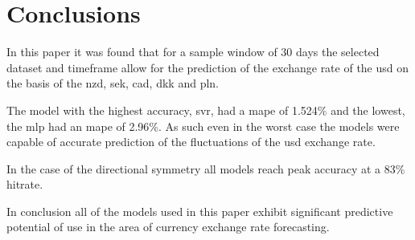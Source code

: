 \section{Conclusions}\label{Conclusions}

In this paper it was found that for a sample window of 30 days the selected dataset and timeframe allow for the prediction of the exchange rate of the \gls{usd} on the basis of the \gls{nzd}, \gls{sek}, \gls{cad}, \gls{dkk} and \gls{pln}.

The model with the highest accuracy, \gls{svr}, had a \gls{mape} of 1.524\% and the lowest, the \gls{mlp} had an \gls{mape} of 2.96\%. As such even in the worst case the models were capable of accurate prediction of the fluctuations of the \gls{usd} exchange rate.

In the case of the directional symmetry all models reach peak accuracy at a 83\% hitrate.

In conclusion all of the models used in this paper exhibit significant predictive potential of use in the area of currency exchange rate forecasting.


